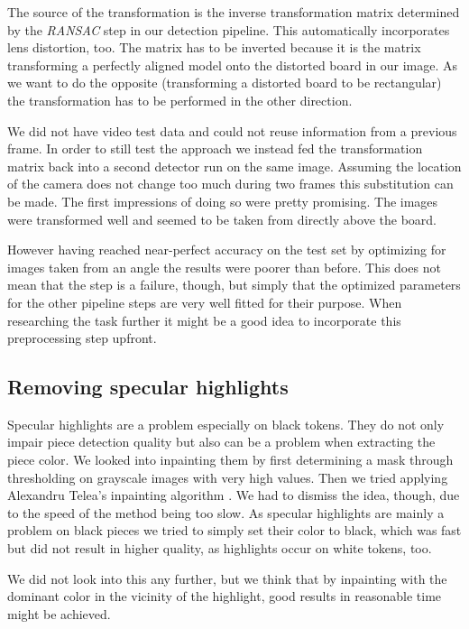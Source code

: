 	The source of the transformation is the inverse transformation matrix determined by the \emph{RANSAC} step in our detection pipeline. This automatically incorporates lens distortion, too. The matrix has to be inverted because it is the matrix transforming a perfectly aligned model onto the distorted board in our image. As we want to do the opposite (transforming a distorted board to be rectangular) the transformation has to be performed in the other direction.

	We did not have video test data and could not reuse information from a previous frame. In order to still test the approach we instead fed the transformation matrix back into a second detector run on the same image. Assuming the location of the camera does not change too much during two frames this substitution can be made. The first impressions of doing so were pretty promising. The images were transformed well and seemed to be taken from directly above the board.

	However having reached near-perfect accuracy on the test set by optimizing for images taken from an angle the results were poorer than before. This does not mean that the step is a failure, though, but simply that the optimized parameters for the other pipeline steps are very well fitted for their purpose. When researching the task further it might be a good idea to incorporate this preprocessing step upfront.

	\subsection{Removing specular highlights}
	\label{evaluation-prepostprocessing-specularHighlights}
	Specular highlights are a problem especially on black tokens. They do not only impair piece detection quality but also can be a problem when extracting the piece color. We looked into inpainting them by first determining a mask through thresholding on grayscale images with very high values. Then we tried applying Alexandru Telea's inpainting algorithm \cite{telea2004image}. We had to dismiss the idea, though, due to the speed of the method being too slow. As specular highlights are mainly a problem on black pieces we tried to simply set their color to black, which was fast but did not result in higher quality, as highlights occur on white tokens, too.

	We did not look into this any further, but we think that by inpainting with the dominant color in the vicinity of the highlight, good results in reasonable time might be achieved.

